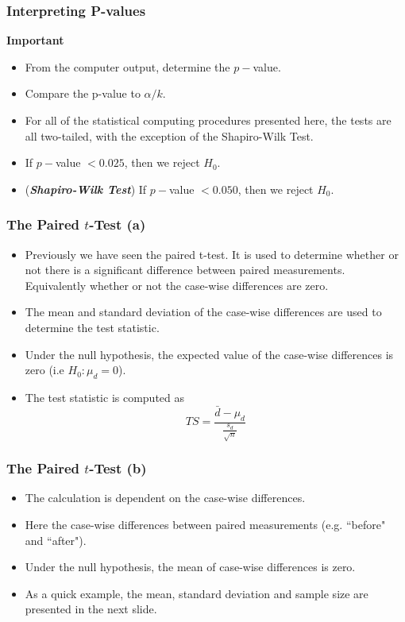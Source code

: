 \begin{frame}
	\frametitle{Interpreting P-values}
	\textbf{Important}
	\begin{itemize}
		\item From the computer output, determine the $p-$value. \smallskip 
		\item Compare the p-value to $\alpha/k$. \smallskip 
		\item For all of the statistical computing procedures presented here, the tests are all two-tailed, with the exception of the Shapiro-Wilk Test. \smallskip 
		\item If $p-$value $< 0.025$, then we reject $H_0$. \smallskip 
		\item (\textbf{\textit{Shapiro-Wilk Test}}) If $p-$value $< 0.050$, then we reject $H_0$.
	\end{itemize}
\end{frame}	

\begin{frame}
\frametitle{The Paired $t$-Test (a)}

\begin{itemize}
\item Previously we have seen the paired t-test. It is used to determine whether or
not there is a significant difference between paired measurements. Equivalently whether or not
the case-wise differences are zero.
\item The mean and standard deviation of the case-wise differences are used to determine the test statistic.
\item Under the null hypothesis, the expected value of the case-wise differences is zero (i.e $H_0 : \mu_d = 0$).
\item The test statistic is computed as
\[ TS = \frac{\bar{d} - \mu_d}{\frac{s_d}{\sqrt{n}}} \]
\end{itemize}
\end{frame}


\begin{frame}[fragile]
\frametitle{The Paired $t$-Test (b)}
\begin{itemize}
\item The calculation is dependent on the case-wise differences.
\item Here the case-wise differences between paired measurements (e.g. ``before" and ``after").
\item Under the null hypothesis, the mean of case-wise differences is zero.
\item As a quick example, the mean, standard deviation and sample size are presented in the next slide.
\end{itemize}
\end{frame}

